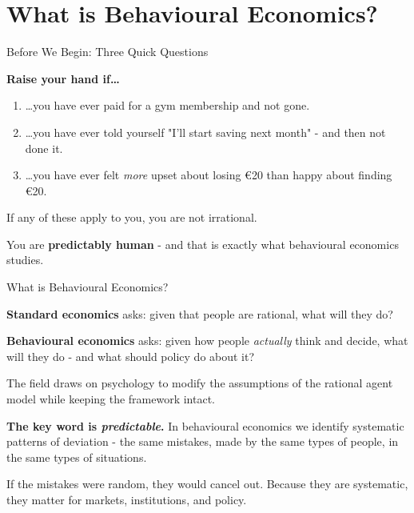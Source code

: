 \documentclass[10pt]{beamer}
\begin{document}
\section{What is Behavioural Economics?}

\begin{frame}{Before We Begin: Three Quick Questions}

\textbf{Raise your hand if\ldots}


\begin{enumerate}
\item \ldots you have ever paid for a gym membership and not gone.


\item \ldots you have ever told yourself "I'll start saving next month" - and then not done it.


\item \ldots you have ever felt \emph{more} upset about losing \euro 20 than happy about finding \euro 20.
\end{enumerate}


\alert{If any of these apply to you, you are not irrational.}

You are \textbf{predictably human} - and that is exactly what behavioural economics studies.
\end{frame}


\begin{frame}{What is Behavioural Economics?}

\textbf{Standard economics} asks: given that people are rational, what will they do?


\textbf{Behavioural economics} asks: given how people \emph{actually} think and decide, what will they do - and what should policy do about it?


The field draws on \alert{psychology} to modify the assumptions of the rational agent model while keeping the framework intact.


\textbf{The key word is \emph{predictable}.}
In behavioural economics we identify \alert{systematic} patterns of deviation - the same mistakes, made by the same types of people, in the same types of situations.


If the mistakes were random, they would cancel out.
Because they are systematic, they matter for markets, institutions, and policy.
\end{frame}
\end{document}
